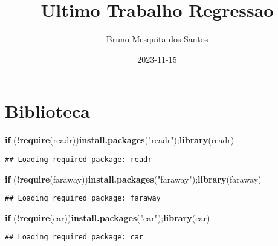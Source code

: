 \documentclass[
]{article}
\title{Ultimo Trabalho Regressao}
\author{Bruno Mesquita dos Santos}
\date{2023-11-15}
\newenvironment{Shaded}{\begin{snugshade}}{\end{snugshade}}
\newcommand{\ControlFlowTok}[1]{\textcolor[rgb]{0.13,0.29,0.53}{\textbf{#1}}}
\newcommand{\FunctionTok}[1]{\textcolor[rgb]{0.13,0.29,0.53}{\textbf{#1}}}
\newcommand{\NormalTok}[1]{#1}
\newcommand{\SpecialCharTok}[1]{\textcolor[rgb]{0.81,0.36,0.00}{\textbf{#1}}}
\newcommand{\StringTok}[1]{\textcolor[rgb]{0.31,0.60,0.02}{#1}}
\begin{document}
\maketitle

\hypertarget{biblioteca}{%
\section{Biblioteca}\label{biblioteca}}

\begin{Shaded}
\begin{Highlighting}[]
\ControlFlowTok{if}\NormalTok{ (}\SpecialCharTok{!}\FunctionTok{require}\NormalTok{(}\StringTok{\textquotesingle{}readr\textquotesingle{}}\NormalTok{))}\FunctionTok{install.packages}\NormalTok{(}\StringTok{"readr"}\NormalTok{);}\FunctionTok{library}\NormalTok{(readr)}
\end{Highlighting}
\end{Shaded}

\begin{verbatim}
## Loading required package: readr
\end{verbatim}

\begin{Shaded}
\begin{Highlighting}[]
\ControlFlowTok{if}\NormalTok{ (}\SpecialCharTok{!}\FunctionTok{require}\NormalTok{(}\StringTok{\textquotesingle{}faraway\textquotesingle{}}\NormalTok{))}\FunctionTok{install.packages}\NormalTok{(}\StringTok{"faraway"}\NormalTok{);}\FunctionTok{library}\NormalTok{(faraway)}
\end{Highlighting}
\end{Shaded}

\begin{verbatim}
## Loading required package: faraway
\end{verbatim}

\begin{Shaded}
\begin{Highlighting}[]
\ControlFlowTok{if}\NormalTok{ (}\SpecialCharTok{!}\FunctionTok{require}\NormalTok{(}\StringTok{\textquotesingle{}car\textquotesingle{}}\NormalTok{))}\FunctionTok{install.packages}\NormalTok{(}\StringTok{"car"}\NormalTok{);}\FunctionTok{library}\NormalTok{(car)}
\end{Highlighting}
\end{Shaded}

\begin{verbatim}
## Loading required package: car
\end{verbatim}
\end{document}
